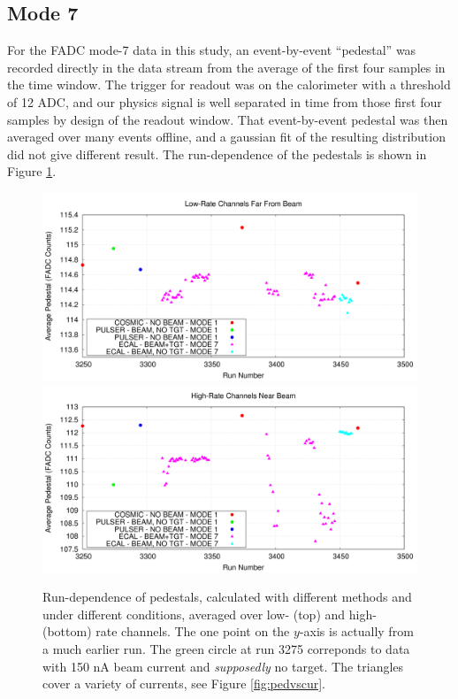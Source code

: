 \documentclass[amsmath,amssymb,notitlepage,12pt]{revtex4-1}
\begin{document}
\subsection{Mode 7}
For the FADC mode-7 data in this study, an event-by-event ``pedestal'' was recorded directly in the data stream from the average of the first four samples in the time window.  The trigger for readout was on the calorimeter with a threshold of 12 ADC, and our physics signal is well separated in time from those first four samples by design of the readout window. 
That event-by-event pedestal was then averaged over many events offline, and a gaussian fit of the resulting distribution did not give different result.  The run-dependence of the pedestals is shown in Figure \ref{fig:pedvsrun}.

\begin{figure}[htbp]\centering
    \includegraphics[width=14cm]{pics/low.png}
    \includegraphics[width=14cm]{pics/hole.png}
    \caption{Run-dependence of pedestals, calculated with different methods and under different conditions, averaged over low- (top) and high- (bottom) rate channels.  The one point on the $y$-axis is actually from a much earlier run.  The green circle at run 3275 correponds to data with 150 nA beam current and {\em supposedly} no target.  The triangles cover a variety of currents, see Figure \ref{fig:pedvscur}. \label{fig:pedvsrun}}
\end{figure}
\newpage
\end{document}
